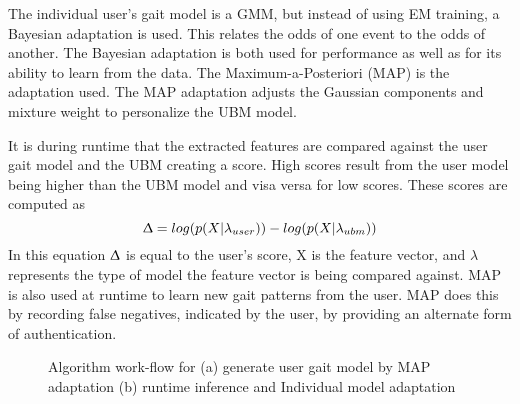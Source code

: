 \documentclass{sig-alternate}
\begin{document}
	The individual user's gait model is a GMM, but instead of using EM training, a Bayesian adaptation is used. This relates the odds of one event to the odds of another. The Bayesian adaptation is both used for performance as well as for its ability to learn from the data. The Maximum-a-Posteriori (MAP) is the adaptation used. The MAP adaptation adjusts the Gaussian components and mixture weight to personalize the UBM model. 
	
	It is during runtime that the extracted features are compared against the user gait model and the UBM creating a score. High scores result from the user model being higher than the UBM model and visa versa for low scores. These scores are computed as \begin{equation}
	\Updelta = log(p(X|\lambda_{user})) - log(p(X|\lambda_{ubm}))
	\end{equation}
In this equation \begin{math} \Updelta \end{math} is equal to the user's score, X is the feature vector, and \begin{math} \lambda \end{math} represents the type of model the feature vector is being compared against. MAP is also used at runtime to learn new gait patterns from the user. MAP does this by recording false negatives, indicated by the user, by providing an alternate form of authentication. 

\begin{figure}
\centering
{}
\caption{Algorithm work-flow for (a) generate user gait model by MAP adaptation (b) runtime inference and Individual model adaptation}
\label{fig:TD2}
\end{figure}

\end{document}
